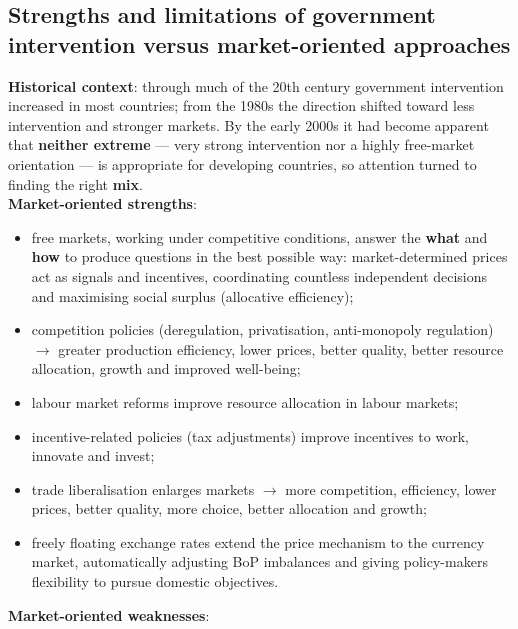 \subsection{Strengths and limitations of government intervention versus market-oriented approaches}
\textbf{Historical context}: through much of the 20th century government intervention increased in most countries; from the 1980s the direction shifted toward less intervention and stronger markets. By the early 2000s it had become apparent that \textbf{neither extreme} --- very strong intervention nor a highly free-market orientation --- is appropriate for developing countries, so attention turned to finding the right \textbf{mix}.
\\
\textbf{Market-oriented strengths}:
\begin{itemize}
  \item free markets, working under competitive conditions, answer the \textbf{what} and \textbf{how} to produce questions in the best possible way: market-determined prices act as signals and incentives, coordinating countless independent decisions and maximising social surplus (allocative efficiency);
  \item competition policies (deregulation, privatisation, anti-monopoly regulation) $\to$ greater production efficiency, lower prices, better quality, better resource allocation, growth and improved well-being;
  \item labour market reforms improve resource allocation in labour markets;
  \item incentive-related policies (tax adjustments) improve incentives to work, innovate and invest;
  \item trade liberalisation enlarges markets $\to$ more competition, efficiency, lower prices, better quality, more choice, better allocation and growth;
  \item freely floating exchange rates extend the price mechanism to the currency market, automatically adjusting BoP imbalances and giving policy-makers flexibility to pursue domestic objectives.
\end{itemize}
\textbf{Market-oriented weaknesses}:
